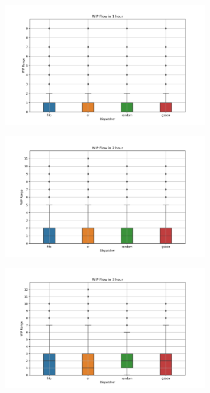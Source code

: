 \begin{figure}[t]
	\centering
	\begin{subfigure}[b]{0.32\textwidth}
		\includegraphics[width=\textwidth]{HVLM/period_3600s.png}
		\caption{}
		\label{fig:p1}
	\end{subfigure}
	\hfill
	\begin{subfigure}[b]{0.32\textwidth}
		\includegraphics[width=\textwidth]{HVLM/period_7200s.png}
		\caption{}
		\label{fig:p2}
	\end{subfigure}
	\hfill
	\begin{subfigure}[b]{0.32\textwidth}
		\includegraphics[width=\textwidth]{HVLM/period_10800s.png}
		\caption{}
		\label{fig:p3}
	\end{subfigure}
	

\end{figure}
